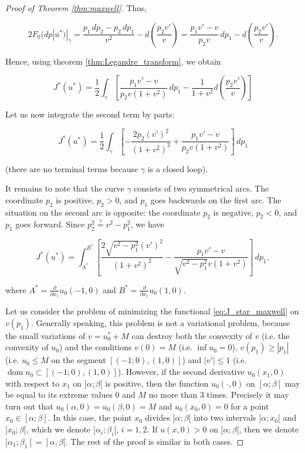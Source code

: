 \documentclass[14pt]{extarticle}
\renewcommand{\le}{\leqslant}
\renewcommand{\ge}{\geqslant}
\DeclareMathOperator{\dom}{\mathrm{dom}}
\theoremstyle{remark}
\theoremstyle{definition}
\begin{document}
\begin{proof}[Proof of Theorem \ref{thm:maxwell}]
\noindent Thus,

\[
	2F_0(dp|u^*)|_\gamma = \frac{p_1\,dp_2 - p_2\,dp_1}{v^2} - d\left(\frac{p_2v'}{v}\right) = 
	\frac{p_1v'-v}{p_2v}\,dp_1 - d\left(\frac{p_2v'}{v}\right).
\]

Hence, using theorem \ref{thm:Legandre_transform}, we obtain

\[
	J^*(u^*) = \frac12\int_\gamma \left[
		\frac{p_1v'-v}{p_2v(1+v^2)}\,dp_1 -
		\frac{1}{1+v^2}d\left(\frac{p_2v'}{v}\right)
	\right] 
\]

\noindent Let us now integrate the second term by parts:

\[
	J^*(u^*) = \frac12\int_\gamma \left[
		-\frac{2p_2(v')^2}{(1+v^2)^2} + \frac{p_1v'-v}{p_2v(1+v^2)}
	\right]\,dp_1
\]

\noindent (there are no terminal terms because $\gamma$ is a closed loop).

It remains to note that the curve $\gamma$ consists of two symmetrical arcs. The coordinate $p_2$ is positive, $p_2>0$, and $p_1$ goes backwards on the first arc. The situation on the second arc is opposite: the coordinate $p_2$ is negative, $p_2<0$, and $p_1$ goes forward. Since $p_2^2 \stackrel{\gamma}{=} v^2-p_1^2$, we have

\begin{equation}
\label{eq:J_star_maxwell}
	J^*(u^*) = \int_{A^*}^{B^*}\left[
		\frac{2\sqrt{v^2-p_1^2}(v')^2}{(1+v^2)^2} - \frac{p_1v'-v}{\sqrt{v^2-p_1^2}v(1+v^2)}
	\right]\,dp_1,
\end{equation}

\noindent where $A^*=\frac{\partial}{\partial x_1}u_0(-1,0)$ and $B^*=\frac{\partial}{\partial x_1}u_0(1,0)$.

Let us consider the problem of minimizing the functional \eqref{eq:J_star_maxwell} on $v(p_1)$. Generally speaking, this problem is not a variational problem, because the small variations of $v=u_0^*+M$ can destroy both the convexity of $v$ (i.e. the convexity of $u_0$) and the conditions $v(0)=M$ (i.e. $\inf u_0=0$), $v(p_1)\ge |p_1|$ (i.e. $u_0\le M$ on the segment $[(-1;0),(1,0)]$) and $|v'|\le 1$ (i.e. $\dom u_0\subset [(-1;0),(1,0)]$). However, if the second derivative $u_0(x_1,0)$ with respect to $x_1$ on $]\alpha;\beta[$ is positive, then the function $u_0(\cdot,0)$ on $[\alpha;\beta]$ may be equal to its extreme values $0$ and $M$ no more than 3 times. Precisely it may turn out that $u_0(\alpha,0)=u_0(\beta,0)=M$ and $u_0(x_0,0)=0$ for a point $x_0\in[\alpha;\beta]$. In this case, the point $x_0$ divides $]\alpha;\beta[$ into two intervals $]\alpha;x_0[$ and $]x_0;\beta[$, which we denote $]\alpha_i;\beta_i[$, $i=1,2$. If $u(x,0)>0$ on $]\alpha;\beta[$, then we denote $]\alpha_1;\beta_1[=]\alpha,\beta[$. The rest of the proof is similar in both cases.


\end{proof}
\end{document}
